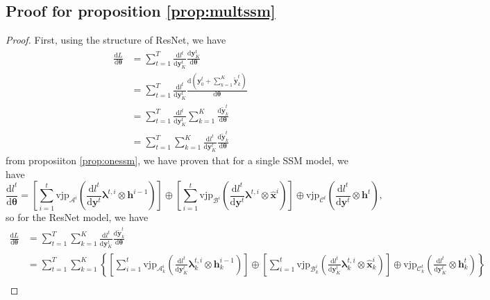 \documentclass{article}
\newtheorem{proof}{Proof}
\newcommand{\A}{\mathcal{A}}
\newcommand{\B}{\mathcal{B}}
\newcommand{\C}{\mathcal{C}}
\newcommand{\vjp}{\mathrm{vjp}}
\newcommand{\diff}{\mathrm{d}}
\newcommand{\blambda}{\boldsymbol{\lambda}}
\begin{document}
\subsection{Proof for proposition \ref{prop:multssm}}
\label{sec:proofMultssm}
\begin{proof}
\label{proof:multssm}
First, using the structure of ResNet, we have
\begin{align*}
    \frac{\diff L}{\diff \boldsymbol{\theta}} &= \sum_{t=1}^T\frac{\diff l^t}{\diff \mathbf{y}_K^t}\frac{\diff \mathbf{y}_K^t}{\diff \boldsymbol{\theta}}\\
    &= \sum_{t=1}^T\frac{\diff l^t}{\diff \mathbf{y}_K^t}\frac{\diff (\mathbf{y}_0^t+\sum_{k=1}^K \tilde{\mathbf{y}}_k^t)}{\diff \boldsymbol{\theta}}\\
    &= \sum_{t=1}^T\frac{\diff l^t}{\diff \mathbf{y}_K^t}\sum_{k=1}^K\frac{\diff \tilde{\mathbf{y}}_k^t}{\diff \boldsymbol{\theta}}\\
    &= \sum_{t=1}^T\sum_{k=1}^K\frac{\diff l^t}{\diff \mathbf{y}_K^t}\frac{\diff \tilde{\mathbf{y}}_k^t}{\diff \boldsymbol{\theta}}
\end{align*}
from proposiiton \ref{prop:onessm}, we have proven that for a single SSM model, we have
\begin{equation*}
    \frac{\diff l^t}{\diff\boldsymbol{\theta}} = \left[ \sum_{i=1}^{t}\vjp_{\boldsymbol{\A}^i}(\frac{\diff l^t}{\diff \mathbf{y}^t}\blambda^{t,i}\otimes \mathbf{h}^{i-1})\right ] \oplus \left [ \sum_{i=1}^{t}\vjp_{\boldsymbol{\B}^i}(\frac{\diff l^t}{\diff \mathbf{y}^t}\blambda^{t,i}\otimes \hat{\mathbf{x}}^i) \right ] \oplus \vjp_{\boldsymbol{\C}^t}(\frac{\diff l^t}{\diff \mathbf{y}^t}\otimes \mathbf{h}^t),
\end{equation*}
so for the ResNet model, we have
\begin{equation}
\label{eqn:resnet}
\begin{split}
    \frac{\diff L}{\diff \boldsymbol{\theta}} &= \sum_{t=1}^T\sum_{k=1}^K\frac{\diff l^t}{\diff \mathbf{y}_K^t}\frac{\diff \tilde{\mathbf{y}}_k^t}{\diff \boldsymbol{\theta}}\\
    &=\sum_{t=1}^T\sum_{k=1}^K \left\{ \left[ \sum_{i=1}^{t}\vjp_{\boldsymbol{\A}^i_k}(\frac{\diff l^t}{\diff \mathbf{y}_K^t}\blambda^{t,i}_k\otimes \mathbf{h}^{i-1}_k)\right] \oplus \left[\sum_{i=1}^{t}\vjp_{\boldsymbol{\B}^i_k}(\frac{\diff l^t}{\diff \mathbf{y}_K^t}\blambda^{t,i}_k\otimes \hat{\mathbf{x}}^i_k) \right] \oplus \vjp_{\boldsymbol{\C}^t_k}(\frac{\diff l^t}{\diff \mathbf{y}_K^t}\otimes \mathbf{h}^t_k) \right\}\\

\end{split}
\end{equation}
\end{proof}
\end{document}
